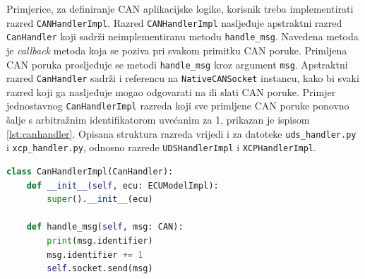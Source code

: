 \documentclass[times, utf8, diplomski, numeric]{fer}
\begin{document}
Primjerice, za definiranje CAN aplikacijske logike, korisnik treba implementirati razred \texttt{CANHandlerImpl}. Razred \texttt{CANHandlerImpl} nasljeđuje apstraktni razred \texttt{CanHandler} koji sadrži neimplementiranu metodu \texttt{handle\_msg}. Navedena metoda je \textit{callback} metoda koja se poziva pri svakom primitku CAN poruke. Primljena CAN poruka prosljeđuje se metodi \texttt{handle\_msg} kroz argument \texttt{msg}. Apstraktni razred \texttt{CanHandler} sadrži i referencu na \texttt{NativeCANSocket} instancu, kako bi svaki razred koji ga nasljeđuje mogao odgovarati na ili slati CAN poruke. Primjer jednostavnog \texttt{CanHandlerImpl} razreda koji sve primljene CAN poruke ponovno šalje s arbitražnim identifikatorom uvećanim za 1, prikazan je ispisom \ref{lst:canhandler}. Opisana struktura razreda vrijedi i za datoteke \texttt{uds\_handler.py} i \texttt{xcp\_handler.py}, odnosno razrede \texttt{UDSHandlerImpl} i \texttt{XCPHandlerImpl}.
\bigskip
\begin{lstlisting}[language=Python, label={lst:canhandler},caption={\texttt{CanHandlerImpl} primjer}]
class CanHandlerImpl(CanHandler):
    def __init__(self, ecu: ECUModelImpl):
        super().__init__(ecu)

    def handle_msg(self, msg: CAN):
        print(msg.identifier)
        msg.identifier += 1
        self.socket.send(msg)
\end{lstlisting}
\end{document}
